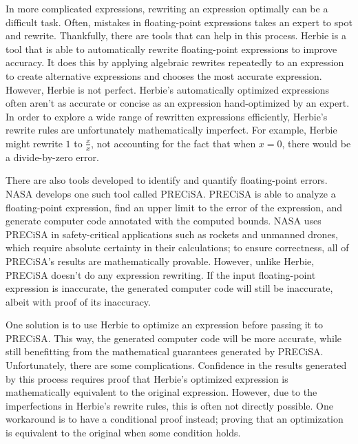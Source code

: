 \documentclass[11pt]{article}
\begin{document}
In more complicated expressions, rewriting an expression optimally
  can be a difficult task.
Often, mistakes in floating-point expressions takes an expert to spot
  and rewrite.
Thankfully, there are tools that can help in this process.
Herbie is a tool that is able to automatically rewrite floating-point
  expressions to improve accuracy.
It does this by applying algebraic rewrites repeatedly to an expression to create
  alternative expressions and chooses the most accurate expression.
However, Herbie is not perfect.
Herbie's automatically optimized expressions often aren't as accurate
  or concise as an expression hand-optimized by an expert.
In order to explore a wide range of rewritten expressions efficiently, 
  Herbie's rewrite rules are unfortunately mathematically imperfect.
For example, Herbie might rewrite $1$ to $\frac{x}{x}$, not accounting
  for the fact that when $x = 0$, there would be a divide-by-zero error.

There are also tools developed to identify and quantify floating-point errors.
NASA develops one such tool called PRECiSA.
PRECiSA is able to analyze a floating-point expression, find an upper limit
  to the error of the expression, and generate computer code annotated with the computed bounds.
NASA uses PRECiSA in safety-critical applications such as rockets and unmanned drones,
  which require absolute certainty in their calculations;
  to ensure correctness, all of PRECiSA's results are mathematically provable.
However, unlike Herbie, PRECiSA doesn't do any expression rewriting.
If the input floating-point expression is inaccurate, the generated computer code will still be
  inaccurate, albeit with proof of its inaccuracy.

One solution is to use Herbie to optimize an expression before passing it to PRECiSA.
This way, the generated computer code will be more accurate, while still benefitting from
  the mathematical guarantees generated by PRECiSA.
Unfortunately, there are some complications.
Confidence in the results generated by this process requires proof that Herbie's optimized
  expression is mathematically equivalent to the original expression.
However, due to the imperfections in Herbie's rewrite rules, this is often not directly
  possible.
One workaround is to have a conditional proof instead; proving that an optimization is
  equivalent to the original when some condition holds.
\end{document}
